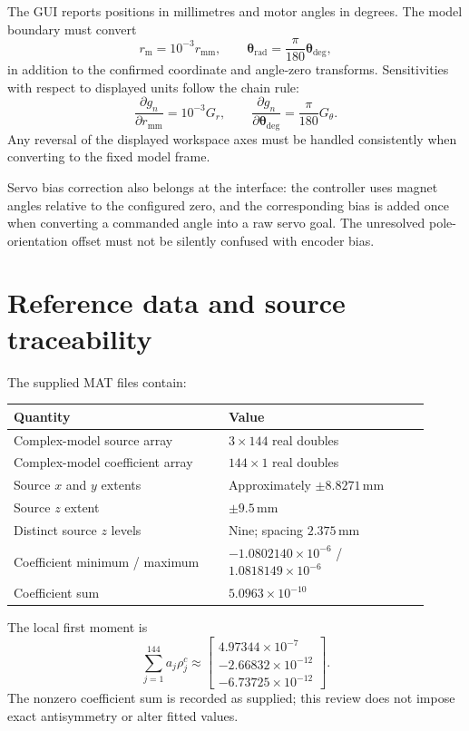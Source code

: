\documentclass[11pt,a4paper]{article}
\numberwithin{equation}{section}
\newcommand{\thv}{\bm{\theta}}
\begin{document}
The GUI reports positions in millimetres and motor angles in degrees.
The model boundary must convert
\begin{equation}
r_{\mathrm{m}}=10^{-3}r_{\mathrm{mm}},\qquad
\thv_{\mathrm{rad}}=\frac{\pi}{180}\thv_{\mathrm{deg}},
\label{eq:unit-boundary}
\end{equation}
in addition to the confirmed coordinate and angle-zero transforms.
Sensitivities with respect to displayed units follow the chain rule:
\begin{equation}
\frac{\partial g_n}{\partial r_{\mathrm{mm}}}=10^{-3}G_r,\qquad
\frac{\partial g_n}{\partial\thv_{\mathrm{deg}}}
=\frac{\pi}{180}G_\theta.
\label{eq:jacobian-unit-boundary}
\end{equation}
Any reversal of the displayed workspace axes must be handled consistently
when converting to the fixed model frame.

Servo bias correction also belongs at the interface: the controller uses
magnet angles relative to the configured zero, and the corresponding bias is
added once when converting a commanded angle into a raw servo goal. The
unresolved pole-orientation offset must not be silently confused with encoder
bias.

\appendix
\section{Reference data and source traceability}
\label{sec:provenance}
The supplied MAT files contain:
\begin{center}
\begin{tabular}{L{0.47\linewidth}L{0.44\linewidth}}
\toprule
Quantity & Value\\
\midrule
Complex-model source array & $3\times144$ real doubles\\
Complex-model coefficient array & $144\times1$ real doubles\\
Source $x$ and $y$ extents & Approximately $\pm8.8271\,\mathrm{mm}$\\
Source $z$ extent & $\pm9.5\,\mathrm{mm}$\\
Distinct source $z$ levels & Nine; spacing $2.375\,\mathrm{mm}$\\
Coefficient minimum / maximum &
  $-1.0802140\times10^{-6}$ / $1.0818149\times10^{-6}$\\
Coefficient sum & $5.0963\times10^{-10}$\\
\bottomrule
\end{tabular}
\end{center}
The local first moment is
\begin{equation}
\sum_{j=1}^{144}a_j\rho_j^c
\approx\begin{bmatrix}
4.97344\times10^{-7}\\
-2.66832\times10^{-12}\\
-6.73725\times10^{-12}
\end{bmatrix}.
\label{eq:source-first-moment}
\end{equation}
The nonzero coefficient sum is recorded as supplied; this review does not
impose exact antisymmetry or alter fitted values.
\end{document}
